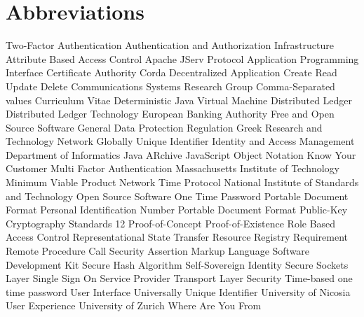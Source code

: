 \chapter*{Abbreviations}

 {Two-Factor Authentication}
 {Authentication and Authorization Infrastructure}
 {Attribute Based Access Control}
 {Apache JServ Protocol}
 {Application Programming Interface}
 {Certificate Authority}
 {Corda Decentralized Application}
 {Create Read Update Delete}
 {Communications Systems Research Group}
 {Comma-Separated values} 
 {Curriculum Vitae}
 {Deterministic Java Virtual Machine}
 {Distributed Ledger}
 {Distributed Ledger Technology}
 {European Banking Authority}
 {Free and Open Source Software}
 {General Data Protection Regulation}
 {Greek Research and Technology Network}
 {Globally Unique Identifier}
 {Identity and Access Management}
 {Department of Informatics}
 {Java ARchive}
 {JavaScript Object Notation}
 {Know Your Customer}
 {Multi Factor Authentication}
 {Massachusetts Institute of Technology}
 {Minimum Viable Product}
 {Network Time Protocol}
 {National Institute of Standards and Technology}
 {Open Source Software}
 {One Time Password}
 {Portable Document Format}
 {Personal Identification Number}
 {Portable Document Format}
 {Public-Key Cryptography Standards 12}
 {Proof-of-Concept}
 {Proof-of-Existence}
 {Role Based Access Control}
 {Representational State Transfer}
 {Resource Registry}
 {Requirement}
 {Remote Procedure Call}
 {Security Assertion Markup Language}
 {Software Development Kit}
 {Secure Hash Algorithm}
 {Self-Sovereign Identity}
 {Secure Sockets Layer}
 {Single Sign On}
 {Service Provider}
 {Transport Layer Security}
 {Time-based one time password}
 {User Interface}
 {Universally Unique Identifier}
 {University of Nicosia}
 {User Experience}
 {University of Zurich}
 {Where Are You From}